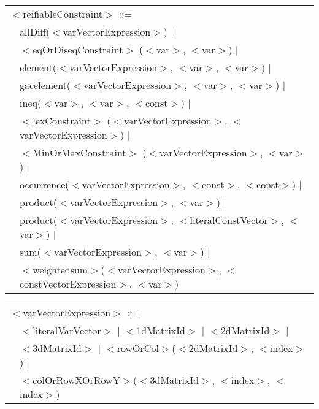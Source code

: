 \documentclass{article}
\begin{document}
\begin{small}
{\noindent
\setlength{\tabcolsep}{0mm}
\begin{tabular}{ll}
\multicolumn{2}{l}{$<$reifiableConstraint$>$ ::=}\\
\hspace*{2mm}              & allDiff($<$varVectorExpression$>$) $|$\\
             & $<$eqOrDiseqConstraint$>$ ($<$var$>$, $<$var$>$) $|$\\
              & element($<$varVectorExpression$>$, $<$var$>$, $<$var$>$) $|$\\
              & gacelement($<$varVectorExpression$>$, $<$var$>$, $<$var$>$) $|$\\
              & ineq($<$var$>$, $<$var$>$, $<$const$>$) $|$\\
              & $<$lexConstraint$>$ ($<$varVectorExpression$>$, $<$varVectorExpression$>$) $|$\\
              & $<$MinOrMaxConstraint$>$ ($<$varVectorExpression$>$, $<$var$>$) $|$\\
              & occurrence($<$varVectorExpression$>$, $<$const$>$, $<$const$>$) $|$\\ 
              & product($<$varVectorExpression$>$, $<$var$>$) $|$\\
              & product($<$varVectorExpression$>$, $<$literalConstVector$>$, $<$var$>$) $|$\\
              & sum($<$varVectorExpression$>$, $<$var$>$) $|$ \\
              & $<$weightedsum$>$($<$varVectorExpression$>$, $<$constVectorExpression$>$, $<$var$>$)  
\end{tabular}

\noindent
\setlength{\tabcolsep}{0mm}
\begin{tabular}{ll}
\multicolumn{2}{l}{$<$varVectorExpression$>$ ::=}\\
\hspace*{2mm} & $<$literalVarVector$>$ $|$ $<$1dMatrixId$>$ $|$ $<$2dMatrixId$>$ $|$\\
              & $<$3dMatrixId$>$ $|$ $<$rowOrCol$>$($<$2dMatrixId$>$, $<$index$>$) $|$\\
              & $<$colOrRowXOrRowY$>$($<$3dMatrixId$>$, $<$index$>$, $<$index$>$)
\end{tabular}
}  %





\end{small}
\end{document}
